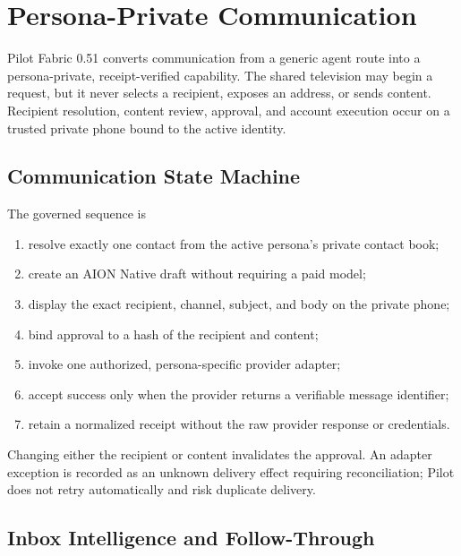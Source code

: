 
\section{Persona-Private Communication}
\label{sec:pilot-communication}

Pilot Fabric 0.51 converts communication from a generic agent route into a
persona-private, receipt-verified capability.  The shared television may begin a
request, but it never selects a recipient, exposes an address, or sends content.
Recipient resolution, content review, approval, and account execution occur on a
trusted private phone bound to the active identity.

\subsection{Communication State Machine}

The governed sequence is
\begin{enumerate}
  \item resolve exactly one contact from the active persona's private contact book;
  \item create an AION Native draft without requiring a paid model;
  \item display the exact recipient, channel, subject, and body on the private phone;
  \item bind approval to a hash of the recipient and content;
  \item invoke one authorized, persona-specific provider adapter;
  \item accept success only when the provider returns a verifiable message identifier;
  \item retain a normalized receipt without the raw provider response or credentials.
\end{enumerate}
Changing either the recipient or content invalidates the approval.  An adapter
exception is recorded as an unknown delivery effect requiring reconciliation;
Pilot does not retry automatically and risk duplicate delivery.

\subsection{Inbox Intelligence and Follow-Through}

